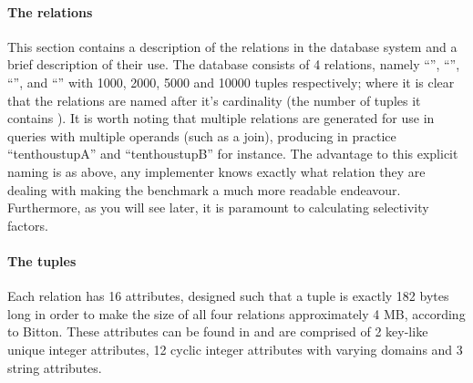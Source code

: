 \paragraph{The relations} This section contains a description of the relations in
the database system and a brief description of their use. The database consists
of 4 relations, namely ``'', ``'',
``'', and ``'' with 1000, 2000, 5000
and 10000 tuples respectively; where it is
clear that the relations are named after it's cardinality (the number of tuples
it contains \cite{PractitionersIntroduction}). It is worth noting that multiple
relations are generated for use in 
queries with multiple operands (such as a join), producing in practice
``tenthoustupA'' and ``tenthoustupB'' for instance. The advantage to this explicit
naming is as above, any implementer knows exactly what relation they are dealing
with making the benchmark a much more readable endeavour. Furthermore, as you will
see later, it is paramount to calculating selectivity factors.

\paragraph{The tuples} Each relation has 16 attributes, designed such that a
tuple is exactly 182 bytes long in order to make the size of all four relations
approximately 4 MB, according to Bitton. These attributes can be found in
 and are comprised of 2 key-like unique integer
attributes, 12 cyclic integer attributes with varying domains and 3 string attributes.

